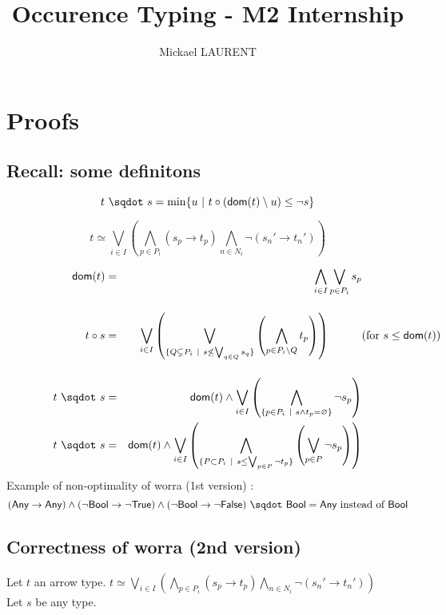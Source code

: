\documentclass[a4paper]{article}%
\title{\vspace{1.5cm}Occurence Typing - M2 Internship}
\author{Mickael LAURENT}
\date{\vspace{-5ex}}
\newcommand{\worra}[2]{#1\mathop{\,\sqdot\,} #2}
\newcommand{\apply}[2]{#1\circ#2}
\newcommand{\dom}[1]{\textsf{dom}(#1)}
\newcommand{\alt}{~|~}
\newcommand{\Any} {\textsf{Any}}%
\newcommand{\Bool} {\textsf{Bool}}
\newcommand{\True} {\textsf{True}}
\newcommand{\False} {\textsf{False}}
\begin{document}
    \maketitle

    \section{Proofs}

    \subsection{Recall: some definitons}

    \[ \worra t s = \min \{ u \alt \apply t {(\dom t \setminus u)} \leq \neg s \} \]

    \[ t \simeq \bigvee_{i\in I}\left(\bigwedge_{p\in P_i}(s_p\to t_p)\bigwedge_{n\in N_i}\neg(s_n'\to t_n')\right) \]

    \begin{eqnarray*}
        \dom{t}    & = & \bigwedge_{i\in I}\bigvee_{p\in P_i}s_p\\[4mm]
        \apply t s & = & \bigvee_{i\in I}\left(\bigvee_{\{Q\subsetneq P_i\alt s\not\leq\bigvee_{q\in Q}s_q\}}\left(\bigwedge_{p\in P_i\setminus Q}t_p\right)\right)\hspace*{1cm}\makebox[0cm][l]{(for $s\leq\dom{t}$)}\\[4mm]
        \worra t s & = & \dom t \wedge\bigvee_{i\in I}\left(\bigwedge_{\{p\in P_i\alt s\wedge t_p=\varnothing\}}\neg s_p \right)\\
        \worra t s & = & \dom t \wedge\bigvee_{i\in I}\left(\bigwedge_{\{P \subset P_i\alt s \leq \bigvee_{p \in P} \neg t_p\}} \left(\bigvee_{p \in P} \neg s_p \right)\right)
    \end{eqnarray*}
    Example of non-optimality of worra (1st version) :
    \[ \worra {(\Any \rightarrow \Any) \land (\neg \Bool \rightarrow \neg \True) \land (\neg \Bool \rightarrow \neg \False)} \Bool = \Any \text{ instead of } \Bool \]
    \pagebreak

    \subsection{Correctness of worra (2nd version)}
    
    Let $t$ an arrow type. $t \simeq \bigvee_{i\in I}\left(\bigwedge_{p\in P_i}(s_p\to t_p)\bigwedge_{n\in N_i}\neg(s_n'\to t_n')\right)$\\
    Let $s$ be any type.
\end{document}
